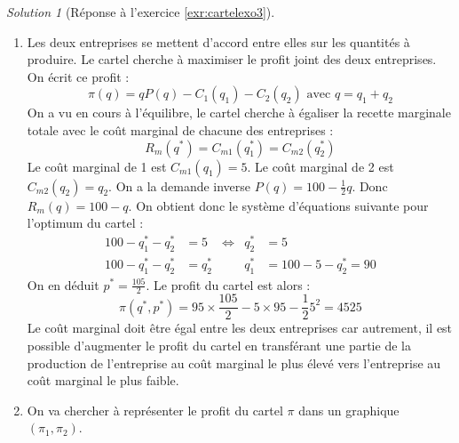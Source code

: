 \documentclass[
]{book}
\theoremstyle{definition}
\theoremstyle{definition}
\theoremstyle{definition}
\theoremstyle{definition}
\theoremstyle{remark}
\newtheorem*{solution}{Solution}
\begin{document}
\begin{solution}[Réponse à l'exercice \ref{exr:cartelexo3}]
\begin{enumerate}
\begin{align*}
  &=-\frac{3}{2}q_2+\frac{105}{2}
  \end{align*}
  En utilisant la condition du premier ordre, on a donc :
  \[-\frac{3}{2}q_2^*+\frac{105}{2}=0\Leftrightarrow q_2^*=35\]
  On en déduit \(q_1^*=95-\frac{1}{2}35=\frac{155}{2}\), donc \(q^*=\frac{225}{2}\) et \(p^*=\frac{175}{4}\).
  Les profits sont donc :
  \begin{gather*}
  \pi_1=\frac{155}{2}\times \frac{175}{4}-5\times\frac{155}{2}=\frac{155^2}{8}\approx 3003\\
  \pi_2=\frac{175}{4}\times 35-\frac{1}{2}35^2=918,75
  \end{gather*}
  Si on regarde les profits dans les deux cas, on constate qu'il est plus intéressant pour chaque entreprise d'être leader.
  Dans ce cas, l'entreprise 1 choisit de produire \(q_1=\frac{280}{3}\) et l'entreprise 2 choisit \(q_2=35\).
  Cette situation est instable, en effet, si 2 choisit la quantité \(q_2=35\), alors la meilleure réponse de 1 est de choisir suivant sa fonction de réaction \(q_1=95-\frac{1}{2}\times35=\frac{165}{2}\neq\frac{280}{3}\).
  En fait, la seule situation stable est la situation de Cournot.
\item
  Les deux entreprises se mettent d'accord entre elles sur les quantités à produire.
  Le cartel cherche à maximiser le profit joint des deux entreprises.
  On écrit ce profit :
  \[\pi(q)=qP(q)-C_1(q_1)-C_2(q_2)\text{ avec }q=q_1+q_2\]
  On a vu en cours à l'équilibre, le cartel cherche à égaliser la recette marginale totale avec le coût marginal de chacune des entreprises :
  \[R_m(q^*)=C_{m1}(q_1^*)=C_{m2}(q_2^*)\]
  Le coût marginal de 1 est \(C_{m1}(q_1)=5\).
  Le coût marginal de 2 est \(C_{m2}(q_2)=q_2\).
  On a la demande inverse \(P(q)=100-\frac{1}{2}q\).
  Donc \(R_m(q)=100-q\).
  On obtient donc le système d'équations suivante pour l'optimum du cartel :
  \begin{align*}
  100-q_1^*-q_2^*&=5&\Leftrightarrow& q_2^*&=5\\
  100-q_1^*-q_2^*&=q_2^*&&q_1^*&=100-5-q_2^*=90
  \end{align*}
  On en déduit \(p^*=\frac{105}{2}\).
  Le profit du cartel est alors :
  \[\pi(q^*, p^*)=95\times \frac{105}{2}-5\times 95-\frac{1}{2}5^2=4525\]
  Le coût marginal doit être égal entre les deux entreprises car autrement, il est possible d'augmenter le profit du cartel en transférant une partie de la production de l'entreprise au coût marginal le plus élevé vers l'entreprise au coût marginal le plus faible.
\item
  On va chercher à représenter le profit du cartel \(\pi\) dans un graphique \((\pi_1, \pi_2)\).

\end{enumerate}
\end{solution}
\end{document}
